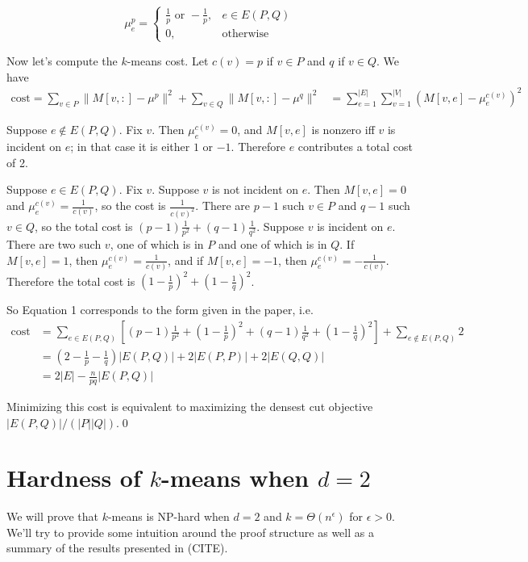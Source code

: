 \begin{equation*}
    \mu_e^p=\begin{cases}\frac{1}{p}\text{ or }-\frac{1}{p},&e\in E(P,Q)\\
                         0,&\text{otherwise}
            \end{cases}
\end{equation*}

Now let's compute the $k$-means cost. Let $c(v)=p$ if $v\in P$ and $q$ if $v\in Q$. We have
\begin{align}
    \text{cost}=\sum_{v\in P}\|M[v,:]-\mu^p\|^2+\sum_{v\in Q}\|M[v,:]-\mu^q\|^2 &= \sum_{e=1}^{|E|}\sum_{v=1}^{|V|}(M[v,e]-\mu_e^{c(v)})^2
\end{align}

Suppose $e\not\in E(P,Q)$. Fix $v$. Then $\mu_e^{c(v)}=0$, and $M[v,e]$ is nonzero iff $v$ is incident on $e$; in that case it is either $1$ or $-1$. Therefore $e$ contributes a total cost of 2.

Suppose $e\in E(P,Q)$. Fix $v$. Suppose $v$ is not incident on $e$. Then $M[v,e]=0$ and $\mu^{c(v)}_e=\frac{1}{c(v)}$, so the cost is $\frac{1}{c(v)^2}$. There are $p-1$ such $v\in P$ and $q-1$ such $v\in Q$, so the total cost is $(p-1)\frac{1}{p^2}+(q-1)\frac{1}{q^2}$. Suppose $v$ is incident on $e$. There are two such $v$, one of which is in $P$ and one of which is in $Q$. If $M[v,e]=1$, then $\mu^{c(v)}_e=\frac{1}{c(v)}$, and if $M[v,e]=-1$, then $\mu^{c(v)}_e=-\frac{1}{c(v)}$. Therefore the total cost is $(1-\frac{1}{p})^2+(1-\frac{1}{q})^2$.

So Equation 1 corresponds to the form given in the paper, i.e.
\begin{align}
    \text{cost} &= \sum_{e\in E(P,Q)}[(p-1)\frac{1}{p^2}+\left(1-\frac{1}{p}\right)^2+(q-1)\frac{1}{q^2}+\left(1-\frac{1}{q}\right)^2] + \sum_{e\not\in E(P,Q)}2 \\
    &= \left(2-\frac{1}{p}-\frac{1}{q}\right)|E(P,Q)|+2|E(P,P)|+2|E(Q,Q)| \\
    &= 2|E| - \frac{n}{pq}|E(P,Q)|
\end{align}

Minimizing this cost is equivalent to maximizing the densest cut objective $|E(P,Q)|/(|P||Q|)$.\qed

\section{Hardness of $k$-means when $d=2$}

We will prove that $k$-means is NP-hard when $d=2$ and $k=\Theta(n^\epsilon)$ for $\epsilon>0$. We'll try to provide some intuition around the proof structure as well as a summary of the results presented in (CITE).

